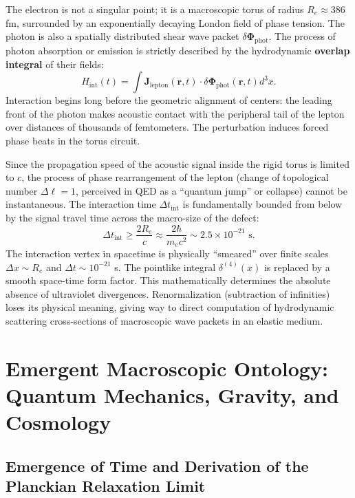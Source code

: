 \documentclass[11pt,a4paper]{article}
\begin{document}
The electron is not a singular point; it is a macroscopic torus of radius $R_e \approx 386$ fm, surrounded by an exponentially decaying London field of phase tension. The photon is also a spatially distributed shear wave packet $\delta \mathbf{\Phi}_{\text{phot}}$.
The process of photon absorption or emission is strictly described by the hydrodynamic \textbf{overlap integral} of their fields:
\begin{equation}
H_{\text{int}}(t) = \int \mathbf{J}_{\text{lepton}}(\mathbf{r}, t) \cdot \delta \mathbf{\Phi}_{\text{phot}}(\mathbf{r}, t) d^3x.
\end{equation}
Interaction begins long before the geometric alignment of centers: the leading front of the photon makes acoustic contact with the peripheral tail of the lepton over distances of thousands of femtometers. The perturbation induces forced phase beats in the torus circuit.

Since the propagation speed of the acoustic signal inside the rigid torus is limited to $c$, the process of phase rearrangement of the lepton (change of topological number $\Delta \ell = 1$, perceived in QED as a ``quantum jump'' or collapse) cannot be instantaneous. The interaction time $\Delta t_{\text{int}}$ is fundamentally bounded from below by the signal travel time across the macro-size of the defect:
\begin{equation}
\Delta t_{\text{int}} \ge \frac{2 R_e}{c} \approx \frac{2 \hbar}{m_e c^2} \sim 2.5 \times 10^{-21} \text{ s}.
\end{equation}
The interaction vertex in spacetime is physically ``smeared'' over finite scales $\Delta x \sim R_e$ and $\Delta t \sim 10^{-21}$ s. The pointlike integral $\delta^{(4)}(x)$ is replaced by a smooth space-time form factor. This mathematically determines the absolute absence of ultraviolet divergences.
Renormalization (subtraction of infinities) loses its physical meaning, giving way to direct computation of hydrodynamic scattering cross-sections of macroscopic wave packets in an elastic medium.

\section{Emergent Macroscopic Ontology: Quantum Mechanics, Gravity, and Cosmology}

\subsection{Emergence of Time and Derivation of the Planckian Relaxation Limit}
\end{document}
